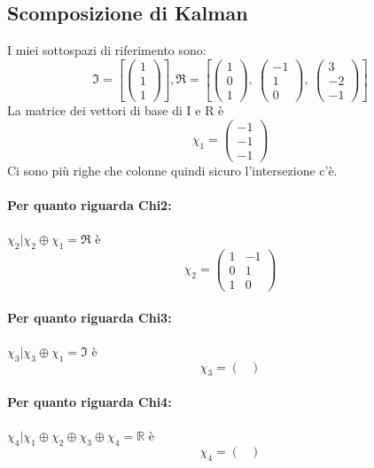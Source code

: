 \documentclass{article}
\begin{document}
\subsection{Scomposizione di Kalman}
I miei sottospazi di riferimento sono:	\[ \mathfrak{I} = \left[ \left(\begin{matrix}1\\1\\1\end{matrix}\right)\right], \mathfrak{R} = \left[ \left(\begin{matrix}1\\0\\1\end{matrix}\right), \  \left(\begin{matrix}-1\\1\\0\end{matrix}\right), \  \left(\begin{matrix}3\\-2\\-1\end{matrix}\right)\right] \]
La matrice dei vettori di base di I e R è \[ \chi_1 =  \left(\begin{matrix}-1\\-1\\-1\end{matrix}\right) \]
Ci sono più righe che colonne quindi sicuro l'intersezione c'è.

\paragraph{Per quanto riguarda Chi2:} $ \chi_2 | \chi_2 \oplus \chi_1 = \mathfrak{R} $ è \[ \chi_2 = \left(\begin{matrix}1 & -1\\0 & 1\\1 & 0\end{matrix}\right) \]

\paragraph{Per quanto riguarda Chi3:} $ \chi_3 | \chi_3 \oplus \chi_1 = \mathfrak{I} $ è \[ \chi_3 = \left(\begin{matrix}\end{matrix}\right) \]

\paragraph{Per quanto riguarda Chi4:} $ \chi_4 | \chi_1 \oplus \chi_2 \oplus  \chi_3 \oplus \chi_4 = \mathbb{R} $ è \[ \chi_4 = \left(\begin{matrix}\end{matrix}\right) \]
\end{document}
